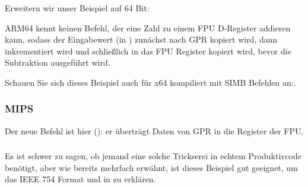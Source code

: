 Erweitern wir unser Beispiel auf 64 Bit:


ARM64 kennt keinen Befehl, der eine Zahl zu einem FPU D-Register addieren kann, sodass der Eingabewert (in )
zunächst nach \ac{GPR} kopiert wird, dann inkrementiert wird und schließlich in das FPU Register  kopiert wird,
bevor die Subtraktion ausgeführt wird.


Schauen Sie sich dieses Beispiel auch für x64 kompiliert mit SIMB Befehlen an:.

\subsubsection{MIPS}

Der neue Befehl ist hier  (): er überträgt Daten von \ac{GPR} in die Register der
FPU.



\subsubsection{\Conclusion}
Es ist schwer zu sagen, ob jemand eine solche Trickserei in echtem Produktivcode benötigt, aber wie bereits mehrfach
erwähnt, ist dieses Beispiel gut geeignet, um das IEEE 754 Format und  in \CCpp zu erklären.

